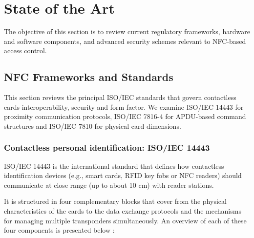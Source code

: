 \chapter{State of the Art}
\label{chap:state_of_the_art}

The objective of this section is to review current regulatory frameworks, hardware and software components, and advanced security schemes relevant to NFC-based access control.


\section{NFC Frameworks and Standards}

This section reviews the principal ISO/IEC standards that govern contactless cards interoperability, security and form factor. We examine ISO/IEC 14443 \cite{Ref23} for proximity communication protocols, ISO/IEC 7816-4 \cite{Ref24} for APDU-based command structures and ISO/IEC 7810 \cite{Ref25} for physical card dimensions.

\subsection{Contactless personal identification: ISO/IEC 14443}

ISO/IEC 14443 \cite{Ref23} is the international standard that defines how contactless identification devices (e.g., smart cards, RFID key fobs or NFC readers) should communicate at close range (up to about 10 cm) with reader stations.

It is structured in four complementary blocks that cover from the physical characteristics of the cards to the data exchange protocols and the mechanisms for managing multiple transponders simultaneously. An overview of each of these four components is presented below \cite{Ref65}:

